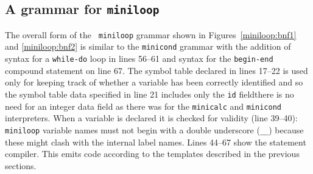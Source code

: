 \subsection{A grammar for {\tt miniloop}} The overall form of the {\tt
miniloop} grammar shown in Figures~\ref{miniloop:bnf1} and
\ref{miniloop:bnf2} is similar to the {\tt minicond} grammar with the
addition of syntax for a {\tt while-do} loop in lines 56--61 and syntax
for the {\tt begin-end} compound statement on line 67. The symbol table
declared in lines 17--22 is used only for keeping track of whether a
variable has been correctly identified and so the symbol table data
specified in line 21 includes only the {\tt id} field\dash there is no
need for an integer data field as there was for the {\tt minicalc} and
{\tt minicond} interpreters. When a variable is declared it is checked
for validity  (line 39--40): {\tt miniloop} variable names must not
begin with a double underscore (\verb|__|) because these might clash
with the internal label names. Lines 44--67 show the statement compiler.
This emits code according to the templates described in the previous
sections.

